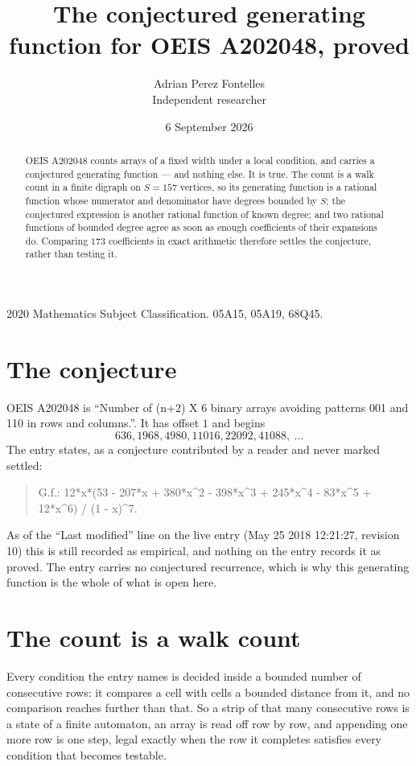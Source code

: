 \documentclass[11pt,a4paper]{article}
\title{The conjectured generating function for OEIS A202048, proved}
\author{Adrian Perez Fontelles\\ \small Independent researcher}
\date{6 September 2026}
\theoremstyle{plain}
\theoremstyle{definition}
\begin{document}
\maketitle

\begin{abstract}
OEIS A202048 counts arrays of a fixed width under a local condition, and carries a conjectured
generating function --- and nothing else. It is true. The count is a walk count in a finite
digraph on $S=157$ vertices, so its generating function is a rational function whose numerator
and denominator have degrees bounded by $S$; the conjectured expression is another rational
function of known degree; and two rational functions of bounded degree agree as soon as enough
coefficients of their expansions do. Comparing $173$ coefficients in exact arithmetic
therefore settles the conjecture, rather than testing it.
\end{abstract}

\noindent\small 2020 Mathematics Subject Classification. 05A15, 05A19, 68Q45.\normalsize

\section{The conjecture}

OEIS A202048 is ``Number of (n+2) X 6 binary arrays avoiding patterns 001 and 110 in rows and columns.''. It has offset $1$ and begins
\[
636, 1968, 4980, 11016, 22092, 41088,\ \dots
\]
The entry states, as a conjecture contributed by a reader and never marked settled:
\begin{quote}
G.f.: 12*x*(53 - 207*x + 380*x\^{}2 - 398*x\^{}3 + 245*x\^{}4 - 83*x\^{}5 + 12*x\^{}6) / (1 - x)\^{}7.
\end{quote}
As of the ``Last modified'' line on the live entry (May 25 2018 12:21:27, revision 10) this is still
recorded as empirical, and nothing on the entry records it as proved. The entry carries no
conjectured recurrence, which is why this generating function is the whole of what is open
here.

\section{The count is a walk count}

Every condition the entry names is decided inside a bounded number of consecutive rows: it
compares a cell with cells a bounded distance from it, and no comparison reaches further than
that. So a strip of that many consecutive rows is a state of a finite automaton, an array is
read off row by row, and appending one more row is one step, legal exactly when the row it
completes satisfies every condition that becomes testable.
\end{document}
